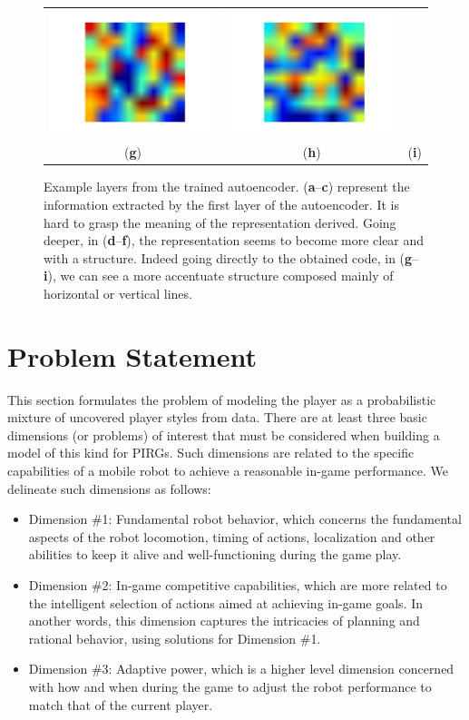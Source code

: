 \begin{figure}[H]
\begin{tabular}{ccc}
\includegraphics[width=0.2\columnwidth]{images/05-modeling/autoencoder_levels/autoencoders_7_1} &
\includegraphics[width=0.2\columnwidth]{images/05-modeling/autoencoder_levels/autoencoders_7_2} \\
(\textbf{g}) & (\textbf{h}) & (\textbf{i}) \\
\end{tabular}
\caption{Example layers from the trained autoencoder. (\textbf{a}--\textbf{c}) represent the information extracted by the first layer of the autoencoder. It is hard to grasp the meaning of the representation derived. Going deeper, in (\textbf{d}--\textbf{f}), the representation seems to become more clear and with a structure. Indeed going directly to the obtained code, in (\textbf{g}--\textbf{i}), we can see a more accentuate structure composed mainly of horizontal or vertical lines.}
\label{fig:levels_autoencoder}
\end{figure}

\section{Problem Statement}
This section formulates the problem of modeling the player as a probabilistic mixture of uncovered player styles from data. There are at least three basic dimensions (or problems) of interest that must be considered when building a model of this kind for PIRGs. Such dimensions are related to the specific capabilities of a mobile robot to achieve a reasonable in-game performance. We delineate such dimensions as follows:

\begin{itemize}[leftmargin=*,labelsep=5.8mm]
\item {Dimension \#1: Fundamental robot behavior}, which concerns the fundamental aspects of the robot locomotion, timing of actions, localization and other abilities to keep it alive and well-functioning during the game play.
\item {Dimension \#2: In-game competitive capabilities}, which are more related to the intelligent selection of actions aimed at achieving in-game goals. In another words, this dimension captures the intricacies of planning and rational behavior, using solutions for Dimension \#1.
\item {Dimension \#3: Adaptive power}, which is a higher level dimension concerned with how and when during the game to adjust the robot performance to match that of the current player.
\end{itemize}

